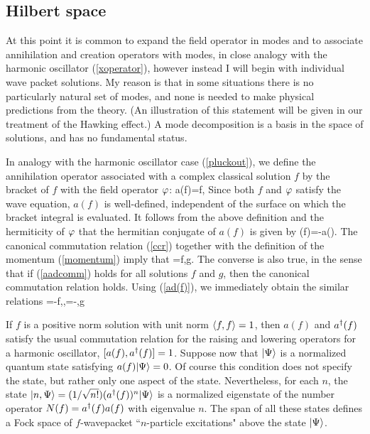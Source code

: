 \documentclass[12pt]{article}
\begin{document}
\subsection{Hilbert space}
\label{Hilbert}
At this point it is common to expand the field operator in
modes and to associate annihilation and creation operators with
modes, in close analogy with the harmonic oscillator
(\ref{xoperator}), however instead I will begin with individual
wave packet solutions. My reason is that in some situations
there is no particularly natural set of modes, and none is
needed to make physical predictions from the theory. (An
illustration of this statement will be given in our treatment of 
the Hawking effect.) A mode
decomposition is a basis in the space of solutions, and has no
fundamental status.

In analogy with the harmonic oscillator case (\ref{pluckout}),
we define the annihilation operator associated with a complex
classical solution $f$ by the bracket of $f$ with the field
operator $\varphi$:
%
\beq a(f)=\la f,\fphi\ra \label{a(f)}\eeq
%
Since both $f$ and $\varphi$ satisfy the wave equation, $a(f)$ is
well-defined, independent of the surface on which the bracket
integral is evaluated. It follows from the above definition and
the hermiticity of $\varphi$ that the hermitian conjugate of
$a(f)$ is given by
%
\beq \ad(f)=-a().\label{ad(f)}\eeq
%
The canonical commutation relation (\ref{ccr}) together with
the definition of the momentum (\ref{momentum}) imply that
%
\beq [a(f),\ad(g)]=\la f,g\ra.\label{aadcomm}\eeq
%
The converse is also true, in the sense that if (\ref{aadcomm})
holds for all solutions $f$ and $g$, then the canonical
commutation relation holds. Using (\ref{ad(f)}), we immediately
obtain the similar relations
%
\beq [a(f),a(g)]=-\la f,\ra,\qquad
[\ad(f),\ad(g)]=-\la {},g\ra \label{aacomm}\eeq
%

If $f$ is a positive norm
solution with unit norm $\langle f,f\rangle=1$, then $a(f)$ and
$a^\dagger(f)$ satisfy the usual commutation relation for the raising
and lowering operators for a harmonic oscillator,
$[a(f),a^\dagger(f)]=1$. Suppose now that $|\Psi\rangle$ is a normalized
quantum state satisfying $a(f)|\Psi\rangle=0$. Of course this
condition does not specify the state, but rather only one
aspect of the state. Nevertheless, for each $n$, the state
$|n,\Psi\rangle=(1/\sqrt{n!})(a^\dagger(f))^n|\Psi\rangle$ is a normalized
eigenstate of the number operator $N(f)=a^\dagger(f)a(f)$ with
eigenvalue $n$. The span of all these states defines a Fock
space of $f$-wavepacket ``$n$-particle excitations" above the
state $|\Psi\rangle$.
\end{document}
